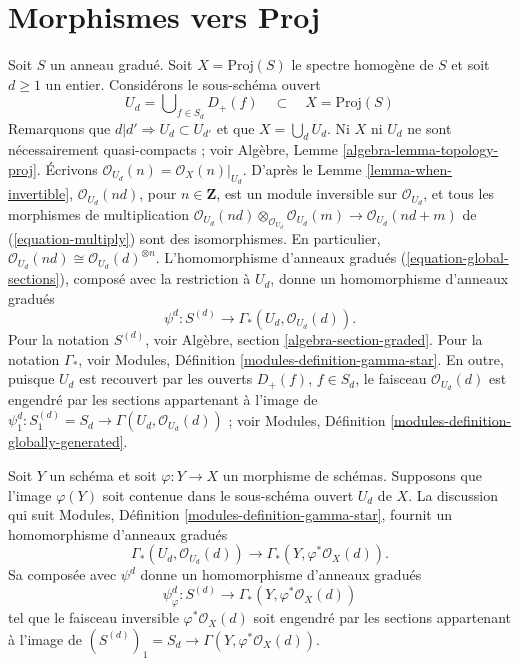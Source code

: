 \section{Morphismes vers Proj}
\label{section-morphisms-proj}

\noindent
Soit $S$ un anneau gradué. Soit $X = \text{Proj}(S)$ le spectre homogène de
$S$ et soit $d \geq 1$ un entier. Considérons le sous-schéma ouvert
\begin{equation}
\label{equation-Ud}
U_d = \bigcup\nolimits_{f  \in S_d} D_{+}(f)
\quad\subset\quad
X = \text{Proj}(S)
\end{equation}
Remarquons que $d | d' \Rightarrow U_d \subset U_{d'}$ et que
$X = \bigcup_d U_d$. Ni $X$ ni $U_d$ ne
sont nécessairement quasi-compacts ;
voir Algèbre, Lemme \ref{algebra-lemma-topology-proj}. Écrivons
$\mathcal{O}_{U_d}(n) = \mathcal{O}_X(n)|_{U_d}$.
D'après le Lemme \ref{lemma-when-invertible},
$\mathcal{O}_{U_d}(nd)$, pour $n \in \mathbf{Z}$, est un module inversible
sur $\mathcal{O}_{U_d}$, et tous
les morphismes de multiplication
$\mathcal{O}_{U_d}(nd) \otimes_{\mathcal{O}_{U_d}} \mathcal{O}_{U_d}(m)
\to \mathcal{O}_{U_d}(nd + m)$ de (\ref{equation-multiply}) sont des
isomorphismes. En particulier,
$\mathcal{O}_{U_d}(nd) \cong \mathcal{O}_{U_d}(d)^{\otimes n}$.
L'homomorphisme d'anneaux gradués (\ref{equation-global-sections}), composé
avec la restriction à $U_d$, donne un homomorphisme d'anneaux gradués
\begin{equation}
\label{equation-psi-d}
\psi^d : S^{(d)} \longrightarrow \Gamma_*(U_d, \mathcal{O}_{U_d}(d)).
\end{equation}
Pour la notation $S^{(d)}$, voir Algèbre,
section \ref{algebra-section-graded}. Pour la notation $\Gamma_*$, voir
Modules, Définition \ref{modules-definition-gamma-star}. En
outre, puisque $U_d$ est recouvert par les ouverts $D_{+}(f)$,
$f \in S_d$, le faisceau
$\mathcal{O}_{U_d}(d)$ est engendré par
les sections appartenant à l'image de
$\psi^d_1 : S^{(d)}_1 = S_d \to \Gamma(U_d, \mathcal{O}_{U_d}(d))$ ; voir
Modules, Définition \ref{modules-definition-globally-generated}.

\medskip\noindent
Soit $Y$ un schéma et soit $\varphi : Y \to X$ un morphisme de schémas.
Supposons que l'image $\varphi(Y)$ soit
contenue dans le sous-schéma ouvert
$U_d$ de $X$. La discussion qui suit Modules,
Définition \ref{modules-definition-gamma-star},
fournit un homomorphisme
d'anneaux gradués
$$
\Gamma_*(U_d, \mathcal{O}_{U_d}(d))
\longrightarrow
\Gamma_*(Y, \varphi^*\mathcal{O}_X(d)).
$$
Sa composée avec $\psi^d$ donne un homomorphisme d'anneaux gradués
\begin{equation}
\label{equation-psi-phi-d}
\psi_\varphi^d :
S^{(d)}
\longrightarrow
\Gamma_*(Y, \varphi^*\mathcal{O}_X(d))
\end{equation}
tel que le faisceau inversible
$\varphi^*\mathcal{O}_X(d)$ soit engendré par
les sections appartenant à l'image de
$(S^{(d)})_1 = S_d \to \Gamma(Y, \varphi^*\mathcal{O}_X(d))$.

